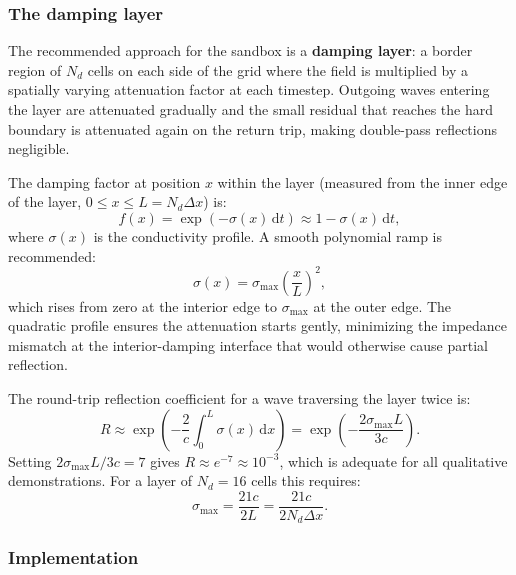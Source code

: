 \documentclass[11pt,a4paper]{article}
\newcommand{\dd}{\mathrm{d}}
\begin{document}
\subsubsection*{The damping layer}

The recommended approach for the sandbox is a \textbf{damping layer}: a border region of $N_d$ cells on each side of the grid where the field is multiplied by a spatially varying attenuation factor at each timestep.  Outgoing waves entering the layer are attenuated gradually and the small residual that reaches the hard boundary is attenuated again on the return trip, making double-pass reflections negligible.

The damping factor at position $x$ within the layer (measured from the inner edge of the layer, $0 \leq x \leq L = N_d\Delta x$) is:
\begin{equation}
  f(x) = \exp\!\left(-\sigma(x)\,\dd t\right) \approx 1 - \sigma(x)\,\dd t,
\end{equation}
where $\sigma(x)$ is the conductivity profile.  A smooth polynomial ramp is recommended:
\begin{equation}
\label{eq:damp_profile}
  \sigma(x) = \sigma_{\max}\!\left(\frac{x}{L}\right)^2,
\end{equation}
which rises from zero at the interior edge to $\sigma_{\max}$ at the outer edge.  The quadratic profile ensures the attenuation starts gently, minimizing the impedance mismatch at the interior-damping interface that would otherwise cause partial reflection.

The round-trip reflection coefficient for a wave traversing the layer twice is:
\begin{equation}
  R \approx \exp\!\left(-\frac{2}{c}\int_0^L \sigma(x)\,\dd x\right)
           = \exp\!\left(-\frac{2\sigma_{\max}L}{3c}\right).
\end{equation}
Setting $2\sigma_{\max}L/3c = 7$ gives $R \approx e^{-7} \approx 10^{-3}$, which is adequate for all qualitative demonstrations.  For a layer of $N_d = 16$ cells this requires:
\begin{equation}
  \sigma_{\max} = \frac{21c}{2L} = \frac{21c}{2 N_d \Delta x}.
\end{equation}

\subsubsection*{Implementation}
\end{document}
